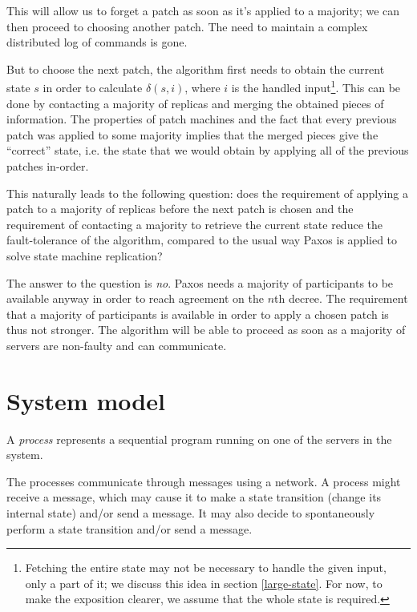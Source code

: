 \documentclass[12pt,a4paper,en]{pracamgr}
\newcommand{\ti}[1]{\textit{#1}}
\begin{document}
This will allow us to forget a patch as soon as it's applied to a majority; we can then proceed to choosing another patch. The need to maintain a complex distributed log of commands is gone.

But to choose the next patch, the algorithm first needs to obtain the current state $s$ in order to calculate $\delta(s, i)$, where $i$ is the handled input\footnote{Fetching the entire state may not be necessary to handle the given input, only a part of it; we discuss this idea in section \ref{large-state}. For now, to make the exposition clearer, we assume that the whole state is required.}. This can be done by contacting a majority of replicas and merging the obtained pieces of information. The properties of patch machines and the fact that every previous patch was applied to some majority implies that the merged pieces give the ``correct'' state, i.e. the state that we would obtain by applying all of the previous patches in-order.

This naturally leads to the following question: does the requirement of applying a patch to a majority of replicas before the next patch is chosen and the requirement of contacting a majority to retrieve the current state reduce the fault-tolerance of the algorithm, compared to the usual way Paxos is applied to solve state machine replication?

The answer to the question is \ti{no}. Paxos needs a majority of participants to be available anyway in order to reach agreement on the $n$th decree. The requirement that a majority of participants is available in order to apply a chosen patch is thus not stronger. The algorithm will be able to proceed as soon as a majority of servers are non-faulty and can communicate.

\section{System model}

A \ti{process} represents a sequential program running on one of the servers in the system.

The processes communicate through messages using a network. A process might receive a message, which may cause it to make a state transition (change its internal state) and/or send a message. It may also decide to spontaneously perform a state transition and/or send a message.
\end{document}
